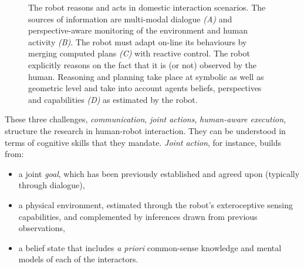 \documentclass[preprint,3p,times]{elsarticle}
\begin{document}
\begin{figure}[htb]
\centering
{}

\caption{The robot reasons and acts in domestic interaction scenarios.  The
    sources of information are multi-modal dialogue {\it (A)} and
    perspective-aware monitoring of the environment and human activity {\it
    (B)}. The robot must adapt on-line its behaviours by merging computed plans
    {\it (C)} with reactive control. The robot explicitly reasons on the fact
    that it is (or not) observed by the human. Reasoning and planning take place
    at symbolic as well as geometric level and take into account agents beliefs,
    perspectives and capabilities {\it (D)} as estimated by the robot.}

\label{fig:hri-dec}
\end{figure}

These three challenges, \emph{communication}, \emph{joint actions},
\emph{human-aware execution}, structure the research in human-robot
interaction. They can be understood in terms of cognitive skills that they
mandate. \emph{Joint action}, for instance, builds from:

\begin {itemize}
    \item a joint \emph{goal}, which has been previously established and agreed
        upon (typically through dialogue),
    
    \item a physical environment, estimated through the robot's exteroceptive
        sensing capabilities, and complemented by inferences drawn from previous
        observations,
    
    \item a belief state that includes {\it a priori} common-sense knowledge and
        mental models of each of the interactors.

\end {itemize}
\end{document}
